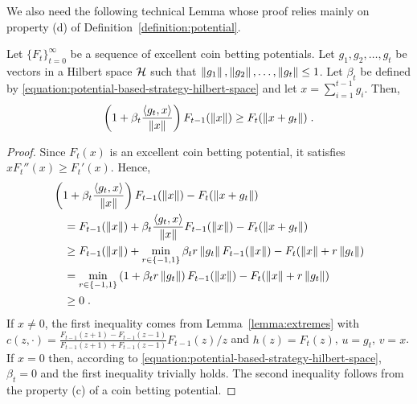 We also need the following technical Lemma whose proof relies mainly on
property (d) of Definition~\ref{definition:potential}.
\begin{lemma}
\label{lemma:recursion_hilbert}
Let $\{F_t\}_{t=0}^\infty$ be a sequence of excellent coin betting potentials.
Let $g_1, g_2, \dots, g_t$ be vectors in a Hilbert space $\mathcal{H}$ such that
$\left\|{g_1}\right\|, \left\|{g_2}\right\|, \dots, \left\|{g_t}\right\| \le 1$. Let $\beta_t$
be defined by \eqref{equation:potential-based-strategy-hilbert-space}
and let $x = \sum_{i=1}^{t-1} g_i$. Then,
\[
\left(1 + \beta_t \frac{\langle g_t, x \rangle}{\left\|{x}\right\|} \right) F_{t-1}(\left\|{x}\right\|)
\ge F_t(\left\|{x + g_t}\right\|) \; .
\]
\end{lemma}
%
\begin{proof}
Since $F_t(x)$ is an excellent coin betting potential, it satisfies $x
F_t''(x) \ge F_t'(x)$. Hence,
\begin{align*}
&\left(1 + \beta_t \frac{\langle g_t, x \rangle}{\left\|{x}\right\|} \right) F_{t-1}(\left\|{x}\right\|) - F_t(\left\|{x + g_t}\right\|) \\
&\quad = F_{t-1}(\left\|{x}\right\|) + \beta_t \frac{\langle g_t, x \rangle}{\left\|{x}\right\|} F_{t-1}(\left\|{x}\right\|) - F_t(\left\|{x + g_t}\right\|) \\
&\quad \ge F_{t-1}(\left\|{x}\right\|)+\min_{r \in \{-1,1\}} \beta_t r \left\|{g_t}\right\| F_{t-1}(\left\|{x}\right\|) - F_t(\left\|{x}\right\| + r \left\|{g_t}\right\|) \\
&\quad =\min_{r \in \{-1,1\}} \left(1 + \beta_t r \left\|{g_t}\right\|\right) F_{t-1}(\left\|{x}\right\|) - F_t(\left\|{x}\right\| + r \left\|{g_t}\right\|) \\
&\quad \ge 0 \; .
\end{align*}
If $x \neq 0$, the first inequality comes from Lemma~\ref{lemma:extremes} with
$c(z,\cdot) = \frac{F_{t-1}(z+1) - F_{t-1}(z-1)}{F_{t-1}(z+1) + F_{t-1}(z-1)} F_{t-1}(z) / z$ and
$h(z) = F_t(z)$, $u=g_t$, $v=x$.
If $x=0$ then, according to
\eqref{equation:potential-based-strategy-hilbert-space}, $\beta_t = 0$ and the
first inequality trivially holds. The second inequality follows from the
property (c) of a coin betting potential.
\end{proof}


